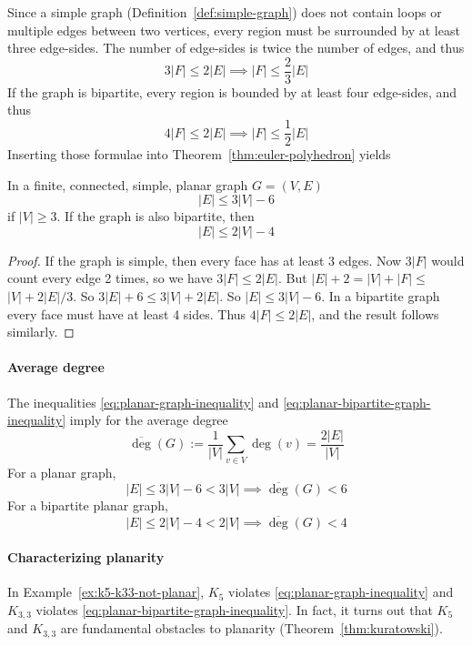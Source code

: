 Since a simple graph (Definition~\ref{def:simple-graph}) does not contain loops or multiple edges between two vertices, every region must be surrounded by at least three edge-sides.
The number of edge-sides is twice the number of edges, and thus
\[
3|F| \leq 2|E| \implies |F| \leq \frac{2}{3}|E|
\]
If the graph is bipartite, every region is bounded by at least four edge-sides, and thus
\[
4|F| \leq 2|E| \implies |F| \leq \frac{1}{2}|E|
\]
Inserting those formulae into Theorem~\ref{thm:euler-polyhedron} yields
\begin{corollary}
In a finite, connected, simple, planar graph \(G=(V,E)\)
\begin{equation}\label{eq:planar-graph-inequality}
|E| \leq 3 |V| - 6
\end{equation}
if \(|V| \geq 3\).
If the graph is also bipartite, then
\begin{equation}\label{eq:planar-bipartite-graph-inequality}
|E| \leq 2 |V| - 4 %
\end{equation}
\end{corollary}
\begin{proof}
If the graph is simple, then every face has at least 3 edges. 
Now $3 |F|$ would count every edge 2 times, so we have $3 |F| \leq 2 |E|$. 
But $|E|+2=|V|+|F| \leq$ $|V|+2 |E| / 3$. 
So $3 |E|+6 \leq 3 |V|+2 |E|$. So $|E| \leq 3 |V|-6$. 
In a bipartite graph every face must have at least 4 sides. 
Thus $4 |F| \leq 2 |E|$, and the result follows similarly.
\end{proof}

\paragraph{Average degree}
The inequalities \eqref{eq:planar-graph-inequality} and \eqref{eq:planar-bipartite-graph-inequality} imply for the average degree
\[
\overline{\deg}(G) := \frac{1}{|V|} \sum_{v \in V} \deg(v) = \frac{2|E|}{|V|}
\]
For a planar graph,
\[
|E| \leq 3|V| - 6 < 3|V| \implies \overline{\deg}(G) < 6
\]
For a bipartite planar graph,
\[
|E| \leq 2|V| - 4 < 2|V| \implies \overline{\deg}(G) < 4
\]

\paragraph{Characterizing planarity}
In Example~\ref{ex:k5-k33-not-planar}, $K_5$ violates \eqref{eq:planar-graph-inequality} and $K_{3,3}$ violates \eqref{eq:planar-bipartite-graph-inequality}.
In fact, it turns out that \(K_5\) and \(K_{3,3}\) are fundamental obstacles to planarity (Theorem~\ref{thm:kuratowski}).

